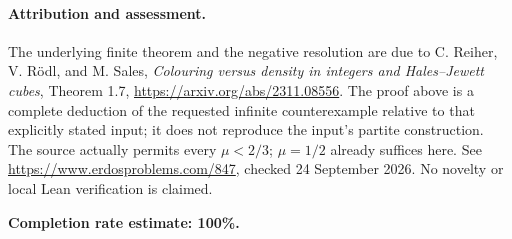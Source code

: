 \paragraph{Attribution and assessment.}
The underlying finite theorem and the negative resolution are due to C. Reiher, V. R\"odl, and M. Sales, \emph{Colouring versus density in integers and Hales--Jewett cubes}, Theorem 1.7, \url{https://arxiv.org/abs/2311.08556}. The proof above is a complete deduction of the requested infinite counterexample relative to that explicitly stated input; it does not reproduce the input's partite construction. The source actually permits every \(\mu<2/3\); \(\mu=1/2\) already suffices here. See \url{https://www.erdosproblems.com/847}, checked 24 September 2026. No novelty or local Lean verification is claimed.

\textbf{Completion rate estimate: 100\%.}
